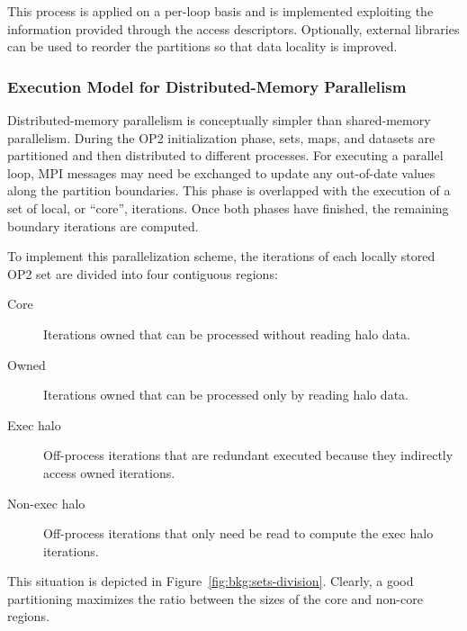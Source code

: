 This process is applied on a per-loop basis and is implemented exploiting the information provided through the access descriptors. Optionally, external libraries can be used to reorder the partitions so that data locality is improved. 

\subsubsection{Execution Model for Distributed-Memory Parallelism}
Distributed-memory parallelism is conceptually simpler than shared-memory parallelism. During the OP2 initialization phase, sets, maps, and datasets are partitioned and then distributed to different processes. For executing a parallel loop, MPI messages may need be exchanged to update any out-of-date values along the partition boundaries. This phase is overlapped with the execution of a set of local, or ``core'', iterations. Once both phases have finished, the remaining boundary iterations are computed.

To implement this parallelization scheme, the iterations of each locally stored OP2 set are divided into four contiguous regions:
\begin{description}
\item[Core] Iterations owned that can be processed without reading halo data. 
\item[Owned] Iterations owned that can be processed only by reading halo data.
\item[Exec halo] Off-process iterations that are redundant executed because they indirectly access owned iterations.
\item[Non-exec halo] Off-process iterations that only need be read to compute the exec halo iterations.
\end{description}
This situation is depicted in Figure~\ref{fig:bkg:sets-division}. Clearly, a good partitioning maximizes the ratio between the sizes of the core and non-core regions. 

